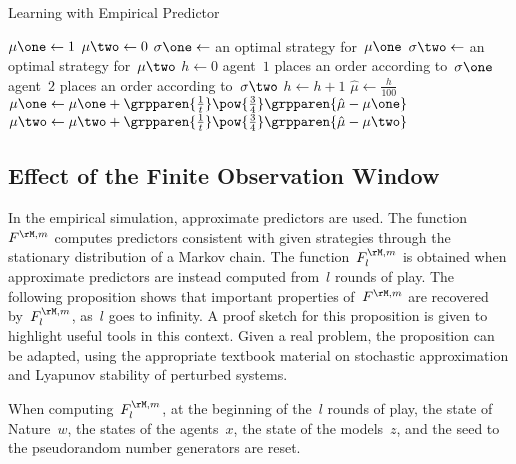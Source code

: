 \begin{algorithm}[pht]
  \caption{Learning with Empirical Predictor}
  \label{alg:empirical_predictor_learning}
  \begin{algorithmic}
      \State \(\mu\one \gets 1\)
      \State \(\mu\two \gets 0\)
        \State \(\sigma\one \gets\) an optimal strategy for~\(\mu\one\)
        \State \(\sigma\two \gets\) an optimal strategy for~\(\mu\two\)
        \State \(h \gets 0\)
          \State agent~\(1\) places an order according to~\(\sigma\one\)
          \State agent~\(2\) places an order according to~\(\sigma\two\)
            \State \(h \gets h+1\)
          \EndIf
        \EndFor
        \State \(\hat{\mu} \gets \frac{h}{100}\)
        \State \(\mu\one \gets \mu\one + \grpparen{\frac{1}{t}}\pow{\frac{3}{4}} \grpparen{\hat{\mu} - \mu\one}\)
        \State \(\mu\two \gets \mu\two + \grpparen{\frac{1}{t}}\pow{\frac{3}{4}} \grpparen{\hat{\mu} - \mu\two}\)
      \EndFor
    \EndProcedure
  \end{algorithmic}
\end{algorithm}

\subsection{Effect of the Finite Observation Window}

In the empirical simulation, approximate predictors are used.
The function~\(\FM\) computes predictors consistent with given strategies through the stationary distribution of a Markov chain.
The function~\(\FM\Ll\) is obtained when approximate predictors are instead computed from~\(l\) rounds of play.
The following proposition shows that important properties of~\(\FM\) are recovered by~\(\FM\Ll\), as~\(l\) goes to infinity.
A proof sketch for this proposition is given to highlight useful tools in this context.
Given a real problem, the proposition can be adapted, using the appropriate textbook material on stochastic approximation and Lyapunov stability of perturbed systems.

\begin{assumption}
\label{ass:non_stochastic}
When computing~\(\FM\Ll\), at the beginning of the~\(l\) rounds of play, the state of Nature~\(w\), the states of the agents~\(x\), the state of the models~\(z\), and the seed to the pseudorandom number generators are reset.
\end{assumption}

